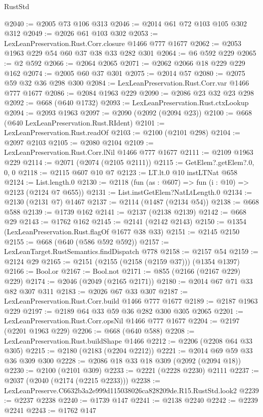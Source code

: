 \begin{lexlean}{RustStd}
\begin{coremodule}
@2040 := @2005 @73 @106 @313
@2046 := @2014 @61 @72 @103 @105 @302 @312
@2049 := @2026 @61 @103 @302
@2053 := LexLeanPreservation.Rust.Corr.closure @1466 @777 @1677
@2062 := @2053 @1963 @229 @54 @60 @37 @38 @33 @282 @301
@2064 := @6 @592 @229
@2065 := @2 @592
@2066 := @2064 @2065
@2071 := @2062 @2066 @18 @229 @229 @162
@2074 := @2005 @60 @37 @301
@2075 := @2014 @57
@2080 := @2075 @59 @32 @36 @298 @300
@2084 := LexLeanPreservation.Rust.Corr.var @1466 @777 @1677
@2086 := @2084 @1963 @229
@2090 := @2086 @23 @32 @23 @298
@2092 := @668 (@640 @1732)
@2093 := LexLeanPreservation.Rust.ctxLookup
@2094 := @2093 @1963
@2097 := @2090 (@2092 (@2094 @23))
@2100 := @668 (@640 LexLeanPreservation.Rust.RIdent)
@2101 := LexLeanPreservation.Rust.readOf
@2103 := @2100 (@2101 @298)
@2104 := @2097 @2103
@2105 := @2080 @2104
@2109 := LexLeanPreservation.Rust.Corr.lNil @1466 @777 @1677
@2111 := @2109 @1963 @229
@2114 := @2071 (@2074 (@2105 @2111))
@2115 := GetElem?.getElem?.{0, 0, 0}
@2118 := @2115 @607 @10 @7
@2123 := LT.lt.{0} @10 instLTNat @658
@2124 := List.length.{0}
@2130 := @2118 (fun (as : @607) => fun (i : @10) => @2123 (@2124 @7 @655))
@2131 := List.instGetElem?NatLtLength.{0}
@2134 := @2130 (@2131 @7) @1467
@2137 := @2114 (@1487 (@2134 @54))
@2138 := @668 @588
@2139 := @1739 @162
@2141 := @2137 (@2138 @2139)
@2142 := @668 @29
@2143 := @1762 @162
@2145 := @2141 (@2142 @2143)
@2150 := @1354 (LexLeanPreservation.Rust.flagOf @1677 @38 @33)
@2151 := @2145 @2150
@2155 := @668 (@640 (@586 @592 @592))
@2157 := LexLeanTarget.RustSemantics.findDispatch @778
@2158 := @2157 @54
@2159 := @2124 @29
@2165 := @2151 (@2155 (@2158 (@2159 @37))) (@1354 @1397)
@2166 := Bool.or
@2167 := Bool.not
@2171 := @855 (@2166 (@2167 @229) @229)
@2174 := @2046 (@2049 (@2165 @2171))
@2180 := @2014 @67 @71 @33 @82 @307 @311
@2183 := @2026 @67 @33 @307
@2187 := LexLeanPreservation.Rust.Corr.build @1466 @777 @1677
@2189 := @2187 @1963 @229
@2197 := @2189 @64 @33 @59 @36 @282 @300 @305 @2065
@2201 := LexLeanPreservation.Rust.Corr.opsNil @1466 @777 @1677
@2204 := @2197 (@2201 @1963 @229)
@2206 := @668 (@640 @588)
@2208 := LexLeanPreservation.Rust.buildShape @1466
@2212 := @2206 (@2208 @64 @33 @305)
@2215 := @2180 (@2183 (@2204 @2212))
@2221 := @2014 @69 @59 @33 @36 @309 @300
@2228 := @2086 @18 @33 @18 @309 (@2092 (@2094 @18))
@2230 := @2100 (@2101 @309)
@2233 := @2221 (@2228 @2230) @2111
@2237 := @2037 (@2040 (@2174 (@2215 @2233)))
@2238 := LexLeanPreserve.C6632b3a2e999d115038026ca828209de.R15.RustStd.look2
@2239 := @2237 @2238
@2240 := @1739 @147
@2241 := @2138 @2240
@2242 := @2239 @2241
@2243 := @1762 @147

\end{coremodule}
\end{lexlean}
